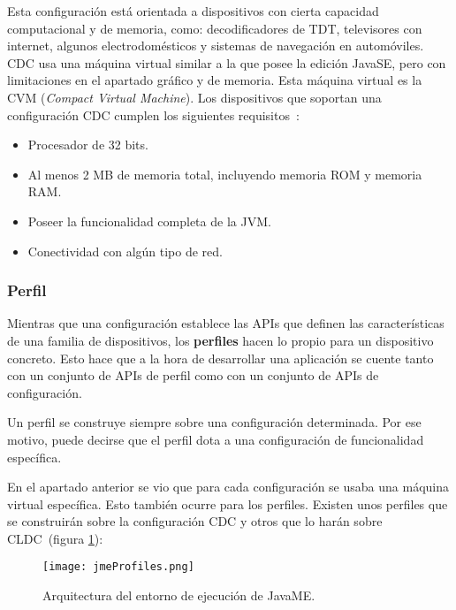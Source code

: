 \begin{itemize}
Esta configuración está orientada a dispositivos con cierta capacidad
computacional y de memoria, como: decodificadores de \acs{TDT}, televisores con
internet, algunos electrodomésticos y sistemas de navegación en automóviles.
\acs{CDC} usa una máquina virtual similar a la que posee la edición
\acs{JavaSE}, pero con limitaciones en el apartado gráfico y de memoria. Esta 
máquina virtual es la \acs{CVM} (\emph{Compact Virtual Machine}).
Los dispositivos que soportan una configuración \acs{CDC} cumplen los
siguientes requisitos~\cite{bib:j2me}:
\begin{itemize}
  \item Procesador de 32 bits.
  \item Al menos 2 MB de memoria total, incluyendo memoria \acs{ROM} y
  memoria \acs{RAM}.
  \item Poseer la funcionalidad completa de la \acs{JVM}.
  \item Conectividad con algún tipo de red.
\end{itemize}
\end{itemize}

\subsubsection{Perfil}
Mientras que una configuración establece las \acs{API}s que definen las 
características de una familia de dispositivos, los \textbf{perfiles} hacen
lo propio para un dispositivo concreto. Esto hace que a la hora de
desarrollar una aplicación se cuente tanto con un conjunto de \acs{API}s 
de perfil como con un conjunto de \acs{API}s de configuración.

Un perfil se construye siempre sobre una configuración determinada. Por ese
motivo, puede decirse que el perfil dota a una configuración de funcionalidad
específica.

En el apartado anterior se vio que para cada configuración se usaba una
máquina virtual específica. Esto también ocurre para los perfiles. Existen
unos perfiles que se construirán sobre la configuración \acs{CDC} y otros
que lo harán sobre \acs{CLDC}~\cite{bib:j2me}(figura \ref{fig:jmeProfiles}):

  \begin{figure}[H]
    \begin{center}
      \texttt{[image: jmeProfiles.png]}
      \caption{Arquitectura del entorno de ejecución de \acs{JavaME}.}
      \label{fig:jmeProfiles}
    \end{center}
  \end{figure}

